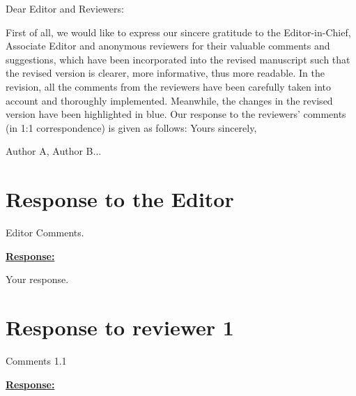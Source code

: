 \documentclass{article}
\begin{document}
	




\noindent
Dear Editor and Reviewers:

\vspace{0.2cm}
\noindent
First of all, we would like to express our sincere gratitude to the Editor-in-Chief, Associate
Editor and anonymous reviewers for their valuable comments and suggestions, which have
been incorporated into the revised manuscript such that the revised version is clearer, more
informative, thus more readable. In the revision, all the comments from the reviewers have
been carefully taken into account and thoroughly implemented. Meanwhile, the changes in the
revised version have been highlighted in blue. Our response to the reviewers’ comments (in
1:1 correspondence) is given as follows:
\vspace{0.2cm}
\noindent
Yours sincerely,

\noindent
Author A, Author B...



\section*{Response to the Editor} 
\begin{cmt*}{}{}
Editor Comments.
\end{cmt*}

\vspace{0.1cm}
\noindent
\underline{\textbf{Response:}}
\vspace{0.2cm}

Your response. 




\newpage
\section{Response to reviewer 1} 

\begin{cmt}{}{}

Comments 1.1

\end{cmt}
\vspace{0.1cm}
\noindent
\underline{\textbf{Response:}}
\vspace{0.2cm}
\end{document}
